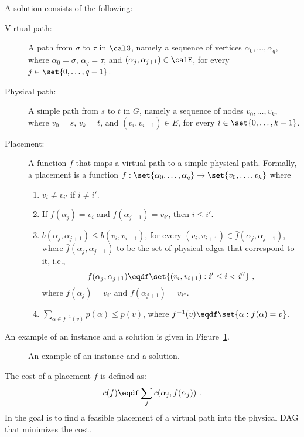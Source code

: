 A solution consists of the following:
\begin{description}
\item[Virtual path:] A path from $\sigma$ to $\tau$ in $\calG$, namely
  a sequence of vertices $\alpha_0,\ldots,\alpha_q$, where
  $\alpha_0 = \sigma$, $\alpha_q = \tau$, and
  $(\alpha_j,\alpha_{j+1}) \in \calE$, for every $j \in
  \set{0,\ldots,q-1}$.

\medskip
  
\item[Physical path:] A simple path from $s$ to $t$ in $G$, namely a
  sequence of nodes $v_0,\ldots,v_k$, where $v_0 = s$, $v_k = t$, and
  $(v_i,v_{i+1}) \in E$, for every $i \in \set{0,\ldots,k-1}$.

\medskip
  
\item[Placement:] A function $f$ that maps a virtual path to a simple
  physical path.  Formally, a placement is a function $f:
  \set{\alpha_0,\ldots,\alpha_q} \to \set{v_0,\ldots,v_k}$ where 
\begin{enumerate}
\item $v_i \neq v_{i'}$ if $i \neq i'$.    
\item If $f(\alpha_j) = v_i$ and $f(\alpha_{j+1}) = v_{i'}$, then $i
  \leq i'$.
\item $b(\alpha_j,\alpha_{j+1}) \leq b(v_i,v_{i+1})$, for every
  $(v_i,v_{i+1}) \in \bar{f}(\alpha_j,\alpha_{j+1})$, where
  $\bar{f}(\alpha_j,\alpha_{j+1})$ to be the set of physical edges
  that correspond to it, i.e.,
\[
\bar{f}(\alpha_j,\alpha_{j+1}) \eqdf \set{(v_i,v_{i+1}) : i' \leq i < i''}
~,
\]
  where $f(\alpha_j) = v_{i'}$ and $f(\alpha_{j+1}) = v_{i''}$.

\item $\sum_{\alpha \in f^{-1}(v)} p(\alpha) \leq p(v)$, where
  $f^{-1}(v) \eqdf \set{\alpha : f(\alpha) = v}$.
 
\end{enumerate}
\end{description}

An example of an \scp instance and a solution is given in
Figure~\ref{fig:solution}.

\begin{figure}[t]
\centering
{}
\caption{An example of an \scp instance and a solution.}
\label{fig:solution}
\end{figure}

The cost of a placement $f$ is defined as:
\[
c(f) \eqdf \sum_j c(\alpha_j,f(\alpha_j))
~.
\]
In \scp the goal is to find a feasible placement of a virtual path
into the physical DAG that minimizes the cost.

